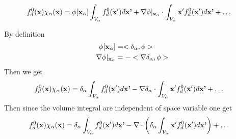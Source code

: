 \begin{align}
    f^0_d(\mathbf{x}) \chi_\alpha (\mathbf{x}) &= \phi[\textbf{x}_\alpha]\int_{V_\alpha} f^0_d(\textbf{x}')d\textbf{x'} +   \mathbf{\nabla} \phi|_{\textbf{x}_\alpha}\cdot\int_{V_\alpha} \textbf{x}'f^0_d(\textbf{x}')d\textbf{x'}+\ldots
\end{align}

By definition
\begin{align*}
    \phi[\textbf{x}_\alpha]&
    =  <\delta_\alpha, \phi>
    \\
    \mathbf{\nabla}\phi|_{\textbf{x}_\alpha}
    &= 
     -<
    \mathbf{\nabla}\delta_\alpha,
    \phi
    >
\end{align*}
Then we get 
\begin{align}
    f^0_d(\mathbf{x}) \chi_\alpha (\mathbf{x}) &= \delta_\alpha\int_{V_\alpha} f^0_d(\textbf{x}')d\textbf{x'} -   \mathbf{\nabla}\delta_\alpha\cdot\int_{V_\alpha} \textbf{x}'f^0_d(\textbf{x}')d\textbf{x'}+\ldots
\end{align}
Then since the volume integral are independent of space variable one get
\begin{align}
    f^0_d(\mathbf{x}) \chi_\alpha (\mathbf{x}) &= \delta_\alpha\int_{V_\alpha} f^0_d(\textbf{x}')d\textbf{x'} -   \mathbf{\nabla} \cdot \left(\delta_\alpha\int_{V_\alpha} \textbf{x}'f^0_d(\textbf{x}')d\textbf{x'}\right)+\ldots
\end{align}